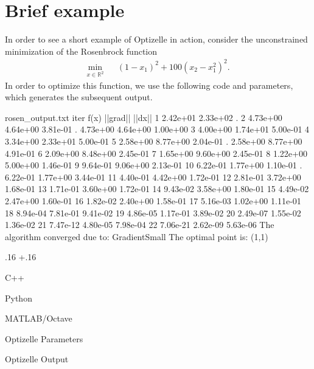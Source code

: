 \documentclass{report}
\newenvironment{boldlist}
    {\begin{list}{}{
        \labelwidth.16\textwidth
        \leftmargin\dimexpr\leftmargin+.16\textwidth
        \renewcommand\makelabel[1]{%
            \textbf{##1}}}}
    {\vspace{-\dimexpr\baselineskip+2\itemsep}\end{list}}
\newcommand{\exampleitem}[2]{
    \item[Language] #1
    \item[Code] #2
    \item[]}
\newcommand{\re}{\mathbb{R}}
\newcommand{\secrosenbrock}{Rosenbrock}
\newcommand{\examplelabel}[2]{\index{Examples!#1}\label{#2}}
\begin{document}
\section{Brief example}\examplelabel{\secrosenbrock}{sec:rosenbrock}

        In order to see a short example of Optizelle in action, consider the unconstrained minimization of the Rosenbrock function
$$
    \begin{array}{rcl}
        \min\limits_{x\in\re^2} && (1-x_1)^2+100(x_2-x_1^2)^2.
    \end{array}
$$
In order to optimize this function, we use the following code and parameters, which generates the subsequent output.

\begin{filecontents*}{rosen_output.txt}
iter        f(x)        ||grad||    ||dx||      
1           2.42e+01    2.33e+02    .           
2           4.73e+00    4.64e+00    3.81e-01    
.           4.73e+00    4.64e+00    1.00e+00    
3           4.00e+00    1.74e+01    5.00e-01    
4           3.34e+00    2.33e+01    5.00e-01    
5           2.58e+00    8.77e+00    2.04e-01    
.           2.58e+00    8.77e+00    4.91e-01    
6           2.09e+00    8.48e+00    2.45e-01    
7           1.65e+00    9.60e+00    2.45e-01    
8           1.22e+00    5.00e+00    1.46e-01    
9           9.64e-01    9.06e+00    2.13e-01    
10          6.22e-01    1.77e+00    1.10e-01    
.           6.22e-01    1.77e+00    3.44e-01    
11          4.40e-01    4.42e+00    1.72e-01    
12          2.81e-01    3.72e+00    1.68e-01    
13          1.71e-01    3.60e+00    1.72e-01    
14          9.43e-02    3.58e+00    1.80e-01    
15          4.49e-02    2.47e+00    1.60e-01    
16          1.82e-02    2.40e+00    1.58e-01    
17          5.16e-03    1.02e+00    1.11e-01    
18          8.94e-04    7.81e-01    9.41e-02    
19          4.86e-05    1.17e-01    3.89e-02    
20          2.49e-07    1.55e-02    1.36e-02    
21          7.47e-12    4.80e-05    7.98e-04    
22          7.06e-21    2.62e-09    5.63e-06    
The algorithm converged due to: GradientSmall
The optimal point is: (1,1) 
\end{filecontents*}

\begin{boldlist}
    \exampleitem
        {C++}
        {}

    \exampleitem
        {Python}
        {}

    \exampleitem
        {MATLAB/Octave}
        {}

    \exampleitem
        {Optizelle Parameters}
        {}

    \exampleitem
        {Optizelle Output}
        {}
\end{boldlist}
\end{document}
